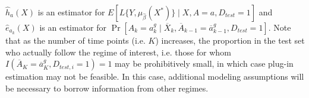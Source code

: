 $\widehat{h}_a(X)$ is an estimator for $E[L\{Y, \mu_{\widehat{\beta}}(X^*)\}\mid X,A = a, D_{test} = 1]$ and $\widehat{e}_{a_k}(X)$ is an estimator for $\Pr[A_k = a^g_k \mid \overline{X}_k, \overline{A}_{k-1} = \overline{a}^g_{k-1}, D_{test} = 1]$. Note that as the number of time points (i.e. $K$) increases, the proportion in the test set who actually follow the regime of interest, i.e. those for whom $I(\overline{A}_K = \overline{a}^g_K, D_{test,i} = 1)=1$ may be prohibitively small, in which case plug-in estimation may not be feasible. In this case, additional modeling assumptions will be necessary to borrow information from other regimes.
\newpage




